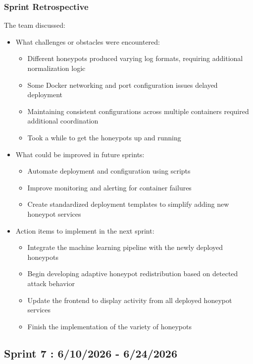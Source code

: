 \documentclass{article}
\begin{document}
\subsubsection{Sprint Retrospective}
The team discussed:

\begin{itemize}
    \item What challenges or obstacles were encountered:
    \begin{itemize}
        \item Different honeypots produced varying log formats, requiring additional normalization logic
        \item Some Docker networking and port configuration issues delayed deployment
        \item Maintaining consistent configurations across multiple containers required additional coordination
        \item Took a while to get the honeypots up and running 
    \end{itemize}
    

    \item What could be improved in future sprints:
     \begin{itemize}
        \item Automate deployment and configuration using scripts
        \item Improve monitoring and alerting for container failures
        \item Create standardized deployment templates to simplify adding new honeypot services
    \end{itemize}

    \item Action items to implement in the next sprint:
     \begin{itemize}
        \item Integrate the machine learning pipeline with the newly deployed honeypots
        \item Begin developing adaptive honeypot redistribution based on detected attack behavior
        \item Update the frontend to display activity from all deployed honeypot services
        \item Finish the implementation of the variety of honeypots 
    \end{itemize}
\end{itemize}



\subsection{Sprint 7 : 6/10/2026 - 6/24/2026}
\end{document}
